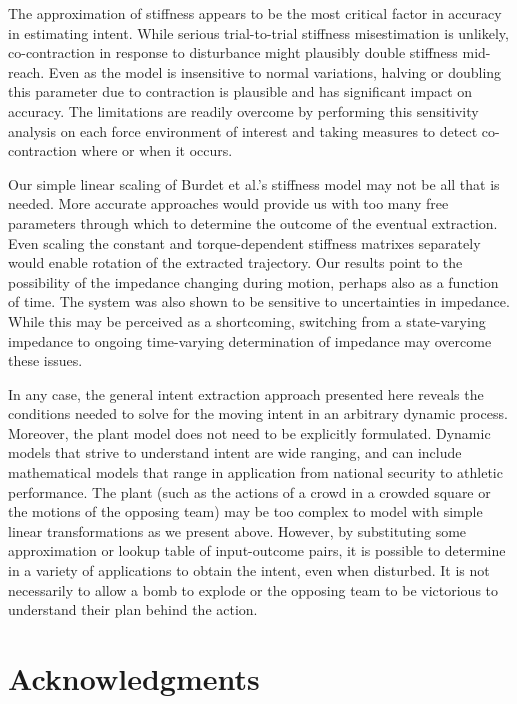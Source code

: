 \documentclass[10pt]{article}
\begin{document}
The approximation of stiffness appears to be the most critical factor in accuracy in estimating intent. While serious trial-to-trial stiffness misestimation is unlikely, co-contraction in response to disturbance might plausibly double stiffness mid-reach. Even as the model is insensitive to normal variations, halving or doubling this parameter due to contraction is plausible and has significant impact on accuracy. The limitations are readily overcome by performing this sensitivity analysis on each force environment of interest and taking measures to detect co-contraction where or when it occurs. 

Our simple linear scaling of Burdet et al.'s stiffness model \cite{burdet2006stability} may not be all that is needed. More accurate approaches would provide us with too many free parameters through which to determine the outcome of the eventual extraction. Even scaling the constant and torque-dependent stiffness matrixes separately would enable rotation of the extracted trajectory. Our results point to the possibility of the impedance changing during motion, perhaps also as a function of time. The system was also shown to be sensitive to uncertainties in impedance. While this may be perceived as a shortcoming, switching from a state-varying impedance to ongoing time-varying determination of impedance may overcome these issues.

In any case, the general intent extraction approach presented here reveals the conditions needed to solve for the moving intent in an arbitrary dynamic process. Moreover, the plant model does not need to be explicitly formulated. Dynamic models that strive to understand intent are wide ranging, and can include mathematical models that range in application from national security to athletic performance. The plant (such as the actions of a crowd in a crowded square or the motions of the opposing team) may be too complex to model with simple linear transformations as we present above. However, by substituting some approximation or lookup table of input-outcome pairs, it is possible to determine in a variety of applications to obtain the intent, even when disturbed. It is not necessarily to allow a bomb to explode or the opposing team to be victorious to understand their plan behind the action.

\section*{Acknowledgments}
\end{document}
